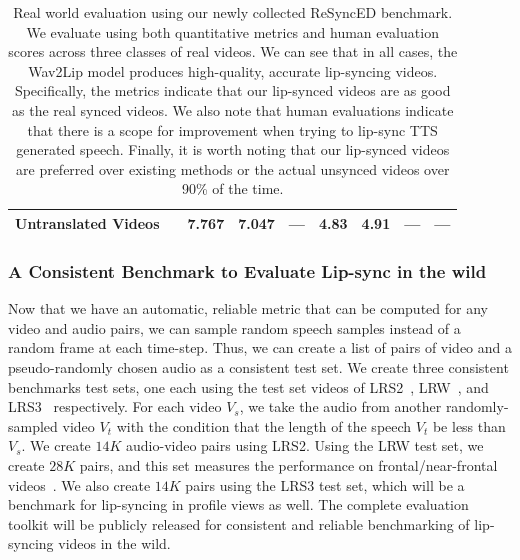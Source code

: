 \documentclass[sigconf]{acmart}
\begin{document}
\begin{table}[ht]
\begin{tabular}{|l|c|c|c|c||c|c|c|c|}
    Untranslated Videos & & 7.767 & 7.047 & --- & 4.83 & 4.91 & --- & --- \\
    \hline
    \end{tabular}
    \caption{Real world evaluation using our newly collected ReSyncED benchmark. We evaluate using both quantitative metrics and human evaluation scores across three classes of real videos. We can see that in all cases, the Wav2Lip model produces high-quality, accurate lip-syncing videos. Specifically, the metrics indicate that our lip-synced videos are as good as the real synced videos. We also note that human evaluations indicate that there is a scope for improvement when trying to lip-sync TTS generated speech. Finally, it is worth noting that our lip-synced videos are preferred over existing methods or the actual unsynced videos over 90\% of the time.}
    \vspace{-0.7cm}
    \label{tab:realvids}
\end{table}

\subsubsection{A Consistent Benchmark to Evaluate Lip-sync in the wild}
\label{subsec:consistent}
Now that we have an automatic, reliable metric that can be computed for any video and audio pairs, we can sample random speech samples instead of a random frame at each time-step. Thus, we can create a list of pairs of video and a pseudo-randomly chosen audio as a consistent test set. We create three consistent benchmarks test sets, one each using the test set videos of LRS2~\cite{Afouras18c}, LRW~\cite{chung2016lip}, and LRS3~\cite{afouras2018lrs3} respectively. For each video $V_s$, we take the audio from another randomly-sampled video $V_t$ with the condition that the length of the speech $V_t$ be less than $V_s$. We create $14K$ audio-video pairs using LRS2. Using the LRW test set, we create $28K$ pairs, and this set measures the performance on frontal/near-frontal videos~\cite{Afouras18}. We also create $14K$ pairs using the LRS3 test set, which will be a benchmark for lip-syncing in profile views as well. The complete evaluation toolkit will be publicly released for consistent and reliable benchmarking of lip-syncing videos in the wild. 
\end{document}
